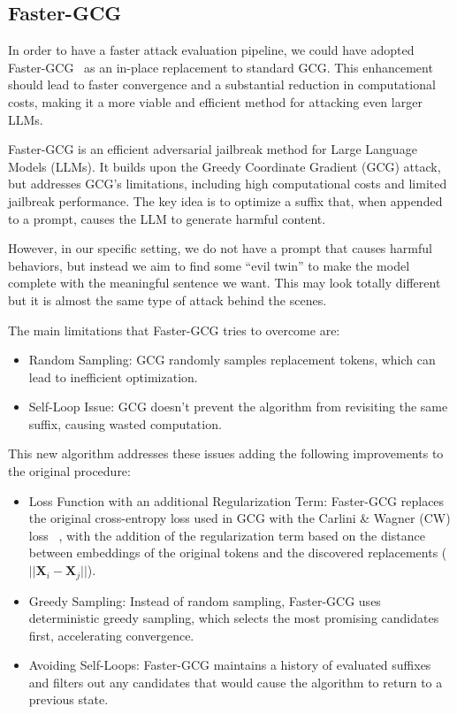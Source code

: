 \documentclass[../thesis.tex]{subfiles}
\begin{document}
\subsection{Faster-GCG}
In order to have a faster attack evaluation pipeline, we could have adopted Faster-GCG~\citep{faster-gcg} as an in-place replacement to standard GCG.
This enhancement should lead to faster convergence and a substantial reduction in computational costs,
making it a more viable and efficient method for attacking even larger LLMs.

Faster-GCG is an efficient adversarial jailbreak method for Large Language Models (LLMs). 
It builds upon the Greedy Coordinate Gradient (GCG) attack, but addresses GCG's limitations,
including high computational costs and limited jailbreak performance.
The key idea is to optimize a suffix that, when appended to a prompt, causes the LLM to generate harmful content.

However, in our specific setting, we do not have a prompt that causes harmful behaviors,
but instead we aim to find some ``evil twin'' to make the model complete with the meaningful sentence we want.
This may look totally different but it is almost the same type of attack behind the scenes.

The main limitations that Faster-GCG tries to overcome are:
\begin{itemize}
    \item Random Sampling: GCG randomly samples replacement tokens, which can lead to inefficient optimization.
    \item Self-Loop Issue: GCG doesn't prevent the algorithm from revisiting the same suffix, causing wasted computation.
\end{itemize}

\noindent
This new algorithm addresses these issues adding the following improvements to the original procedure:
\begin{itemize}
    \item Loss Function with an additional Regularization Term: Faster-GCG replaces the original cross-entropy loss used in GCG with the Carlini \& Wagner (CW) loss ~\citep{carlini-wagner-image-attack}, with the addition of the regularization term based on the distance between embeddings of the original tokens and the discovered replacements ($|| \mathbf{X}_i - \mathbf{X}_j ||$).
    \item Greedy Sampling: Instead of random sampling, Faster-GCG uses deterministic greedy sampling, which selects the most promising candidates first, accelerating convergence.
    \item Avoiding Self-Loops: Faster-GCG maintains a history of evaluated suffixes and filters out any candidates that would cause the algorithm to return to a previous state.
\end{itemize}
\end{document}
